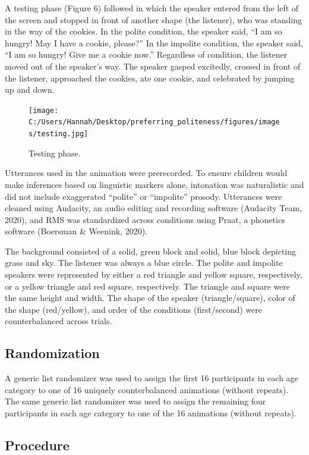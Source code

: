 \documentclass[
  english,
  man,floatsintext]{apa6}
\begin{document}
A testing phase (Figure 6) followed in which the speaker entered from the left of the screen and stopped in front of another shape (the listener), who was standing in the way of the cookies. In the polite condition, the speaker said, ``I am so hungry! May I have a cookie, please?'' In the impolite condition, the speaker said, ``I am so hungry! Give me a cookie now.'' Regardless of condition, the listener moved out of the speaker's way. The speaker gasped excitedly, crossed in front of the listener, approached the cookies, ate one cookie, and celebrated by jumping up and down.

\begin{figure}
\centering
\texttt{[image: C:/Users/Hannah/Desktop/preferring\_politeness/figures/images/testing.jpg]}
\caption{Testing phase.}
\end{figure}

Utterances used in the animation were prerecorded. To ensure children would make inferences based on linguistic markers alone, intonation was naturalistic and did not include exaggerated ``polite'' or ``impolite'' prosody. Utterances were cleaned using Audacity, an audio editing and recording software (Audacity Team, 2020), and RMS was standardized across conditions using Praat, a phonetics software (Boersman \& Weenink, 2020).

The background consisted of a solid, green block and solid, blue block depicting grass and sky. The listener was always a blue circle. The polite and impolite speakers were represented by either a red triangle and yellow square, respectively, or a yellow triangle and red square, respectively. The triangle and square were the same height and width. The shape of the speaker (triangle/square), color of the shape (red/yellow), and order of the conditions (first/second) were counterbalanced across trials.

\hypertarget{randomization}{%
\subsection{Randomization}\label{randomization}}

A generic list randomizer was used to assign the first 16 participants in each age category to one of 16 uniquely counterbalanced animations (without repeats). The same generic list randomizer was used to assign the remaining four participants in each age category to one of the 16 animations (without repeats).

\hypertarget{procedure}{%
\subsection{Procedure}\label{procedure}}
\end{document}
